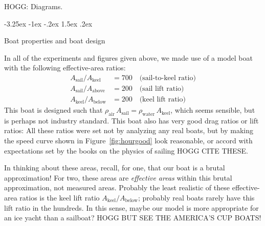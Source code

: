 \documentclass[letterpaper]{article}
\makeatletter
\newcommand{\air}{\text{air}}
\newcommand{\water}{\text{water}}
\newcommand{\sail}{\text{sail}}
\newcommand{\keel}{\text{keel}}
\renewcommand{\above}{\text{above}}
\newcommand{\below}{\text{below}}
\newcommand{\figref}[1]{Figure~\ref{#1}}
\renewcommand\section{\@startsection {section}{1}{\z@}%
  {-3.25ex \@plus -1ex \@minus -.2ex}%
  {1.5ex \@plus .2ex}%
  {\raggedright\normalfont\large\bfseries}}
\makeatother
\begin{document}
HOGG: Diagrams.

\section{Boat properties and boat design}\label{sec:design}

In all of the experiments and figures given above, we made use of a model boat with the following effective-area ratios:
\begin{align}
  A_\sail / A_\keel &= 700 \quad\mbox{(sail-to-keel ratio)}\label{eq:boat1}\\
  A_\sail / A_\above &= 200 \quad\mbox{(sail lift ratio)}\\
  A_\keel / A_\below &= 200 \quad\mbox{(keel lift ratio)}\label{eq:boat4}
\end{align}
This boat is designed such that $\rho_\air\,A_\sail = \rho_\water\,A_\keel$, which seems sensible, but is perhaps not industry standard.
This boat also has very good drag ratios or lift ratios:
All these ratios were set not by analyzing any real boats, but by making the speed curve shown in \figref{fig:hourgood} look reasonable, or accord with expectations set by the books on the physics of sailing HOGG CITE THESE.

In thinking about these areas, recall, for one, that our boat is a brutal approximation!
For two, these areas are \emph{effective areas} within this brutal approximation, not measured areas.
Probably the least realistic of these effective-area ratios is the keel lift ratio $A_\keel/A_\below$; probably real boats rarely have this lift ratio in the hundreds.
In this sense, maybe our model is more appropriate for an ice yacht than a sailboat?
HOGG BUT SEE THE AMERICA'S CUP BOATS!
\end{document}

